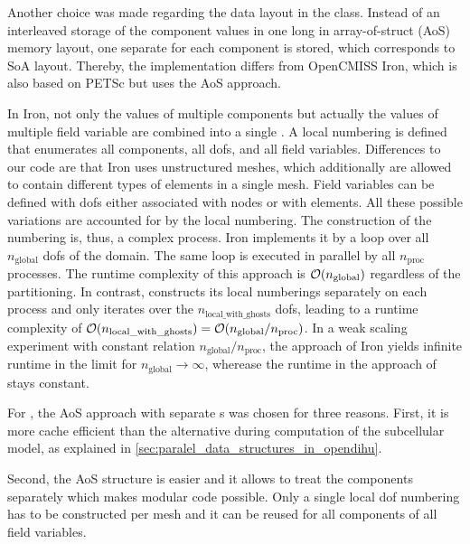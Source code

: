 Another choice was made regarding the data layout in the  class. Instead of an interleaved storage of the component values in one long \Vec{} in array-of-struct (AoS) memory layout, one separate \Vec{} for each component is stored, which corresponds to SoA layout. 
Thereby, the implementation differs from OpenCMISS Iron, which is also based on PETSc but uses the AoS  approach. 

In Iron, not only the values of multiple components but actually the values of multiple field variable are combined into a single \Vec{}. A local numbering is defined that enumerates all components, all dofs, and all field variables. Differences to our code are that Iron uses unstructured meshes, which additionally are allowed to contain different types of elements in a single mesh. Field variables can be defined with dofs either  associated with nodes or with elements. 
All these possible variations are accounted for by the local numbering. 
The construction of the numbering is, thus, a complex process. Iron implements it by a loop over all $n_\text{global}$ dofs of the domain. The same loop is executed in parallel by all $n_\text{proc}$ processes. The runtime complexity of this approach is $\mathcal{O}(n_\text{global})$ regardless of the partitioning. 
In contrast, \opendihu{} constructs its local numberings separately on each process and only iterates over the $n_\text{local\_with\_ghosts}$ dofs, leading to a runtime complexity of $\mathcal{O}(n_\text{local\_with\_ghosts}) = \mathcal{O}(n_\text{global} / n_\text{proc})$. In a weak scaling experiment with constant relation $n_\text{global} / n_\text{proc}$, the approach of Iron yields infinite runtime in the limit for $n_\text{global} \to \infty$, wherease the runtime in the approach of \opendihu{} stays constant.

For \opendihu{}, the AoS approach with separate \Vec{}s was chosen for three reasons. First, it is more cache efficient than the alternative during computation of the subcellular model, as explained in \cref{sec:paralel_data_structures_in_opendihu}.

Second, the AoS structure is easier and it allows to treat the components separately which makes modular code possible. Only a single local dof numbering has to be constructed per mesh and it can be reused for all components of all field variables.


